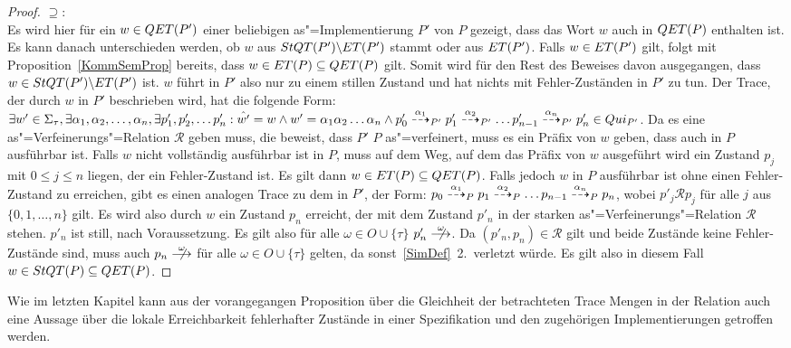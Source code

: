 \begin{proof}
  \glqq$\supseteq$\grqq{}:\\
  Es wird hier für ein $w\in QET (P')$ einer beliebigen as"=Implementierung
  $P'$ von $P$ gezeigt, dass das Wort $w$ auch in $QET (P)$ enthalten ist. Es
  kann danach unterschieden werden, ob $w$ aus $StQT (P')\backslash ET (P')$
  stammt oder aus $ET (P')$. Falls $w\in ET (P')$ gilt, folgt mit
  Proposition~\ref{KommSemProp} bereits, dass $w\in ET (P) \subseteq QET (P)$
  gilt. Somit wird für den Rest des Beweises davon ausgegangen, dass $w\in StQT
  (P')\backslash ET (P')$ ist. $w$ führt in $P'$ also nur zu einem stillen
  Zustand und hat nichts mit Fehler-Zuständen in $P'$ zu tun. Der Trace, der
  durch $w$ in $P'$ beschrieben wird, hat die folgende Form: $\exists w'\in
  \Sigma _{\tau}, \exists \alpha _1, \alpha _2, \dots , \alpha _n, \exists
  p'_1, p'_2, \dots p'_n : \hat{w'} = w \land w' = \alpha _1\alpha _2\dots
  \alpha _n \land p'_0 \may[\alpha _1]_{P'} p'_1 \may[\alpha _2]_{P'} \dots
  p'_{n-1} \may[\alpha _n]_{P'} p'_n \in Qui _{P'}$. Da es eine
  as"=Verfeinerungs"=Relation $\mathcal{R}$ geben muss, die beweist, dass $P'$
  $P$ as"=verfeinert, muss es ein Präfix von $w$ geben, dass auch in $P$
  ausführbar ist. Falls $w$ nicht vollständig ausführbar ist in $P$, muss auf
  dem Weg, auf dem das Präfix von $w$ ausgeführt wird ein Zustand $p_j$ mit $0
  \leq j \leq n$ liegen, der ein Fehler-Zustand ist. Es gilt dann $w\in ET
  (P)\subseteq QET (P)$. Falls jedoch $w$ in $P$ ausführbar ist ohne einen
  Fehler-Zustand zu erreichen, gibt es einen analogen Trace zu dem in $P'$, der
  Form: $p_0 \may[\alpha _1]_P p_1 \may[\alpha _2]_P \dots p_{n-1} \may[\alpha
  _n]_P p_n$, wobei $p'_j \mathcal{R} p_j$ für alle $j$ aus $\{0,1,\dots ,n\}$
  gilt. Es wird also durch $w$ ein Zustand $p_n$ erreicht, der mit dem Zustand
  $p'_n$ in der starken as"=Verfeinerungs"=Relation $\mathcal{R}$ stehen.
  $p'_n$ ist still, nach Voraussetzung. Es gilt also für alle $\omega\in O\cup
  \{\tau\}$ $p'_n\nmust[\omega]$. Da $(p'_n,p_n) \in\mathcal{R}$ gilt und beide
  Zustände keine Fehler-Zustände sind, muss auch $p_n\nmust[\omega]$ für alle
  $\omega\in O\cup \{\tau\}$ gelten, da sonst~\ref{SimDef}~2.\ verletzt würde.
  Es gilt also in diesem Fall $w\in StQT (P)\subseteq QET (P)$.
\end{proof}

Wie im letzten Kapitel kann aus der vorangegangen Proposition über die
Gleichheit der betrachteten Trace Mengen in der Relation \QRel{} auch eine
Aussage über die lokale Erreichbarkeit \glqq fehlerhafter Zustände\grqq{} in
einer Spezifikation und den zugehörigen Implementierungen getroffen werden.

